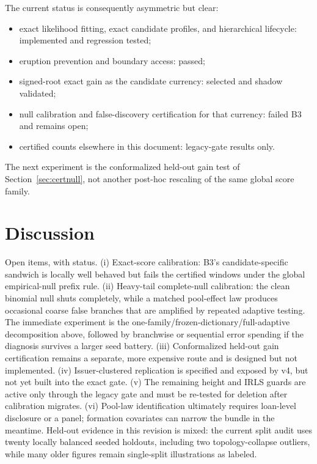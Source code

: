 \documentclass[11pt]{article}
\begin{document}
The current status is consequently asymmetric but clear:
\begin{itemize}[leftmargin=2em,itemsep=1pt]
\item exact likelihood fitting, exact candidate profiles, and hierarchical lifecycle: implemented and
regression tested;
\item eruption prevention and boundary access: passed;
\item signed-root exact gain as the candidate currency: selected and shadow validated;
\item null calibration and false-discovery certification for that currency: failed B3 and remains open;
\item certified counts elsewhere in this document: legacy-gate results only.
\end{itemize}
The next experiment is the conformalized held-out gain test of
Section~\ref{sec:certnull}, not another post-hoc rescaling of the same global score family.

\section{Discussion}\label{sec:discussion}

Open items, with status. (i) Exact-score calibration: B3's candidate-specific
sandwich is locally well behaved but fails the certified windows under the global
empirical-null prefix rule. (ii) Heavy-tail complete-null calibration: the clean binomial
null shuts completely, while a matched pool-effect law produces occasional coarse false
branches that are amplified by repeated adaptive testing. The immediate experiment is the
one-family/frozen-dictionary/full-adaptive decomposition above, followed by branchwise or
sequential error spending if the diagnosis survives a larger seed battery. (iii)
Conformalized held-out gain certification remains a separate, more expensive route and is
designed but not implemented. (iv) Issuer-clustered replication is specified and exposed
by v4, but not yet built into the exact gate. (v) The remaining height and IRLS guards are
active only through the legacy gate and must be re-tested for deletion after calibration
migrates. (vi) Pool-law identification ultimately requires loan-level disclosure or a
panel; formation covariates can narrow the bundle in the meantime. Held-out evidence in
this revision is mixed: the current split audit uses twenty locally balanced seeded holdouts, including two topology-collapse outliers,
while many older figures remain single-split illustrations as labeled.
\end{document}
